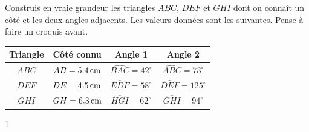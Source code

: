 \documentclass[a4paper,11pt]{report}
\begin{document}
\begin{exo}{Construis en vraie grandeur les triangles $ABC$, $DEF$ et $GHI$ dont on connaît un côté et les deux angles adjacents. Les valeurs données sont les suivantes. Pense à faire un croquis avant.
\begin{center}
\begin{tabular}{|c|c|c|c|}
\hline
\textbf{Triangle} & \textbf{Côté connu} & \textbf{Angle 1} & \textbf{Angle 2} \\
\hline
$ABC$ & $AB = \tunit{5,4}{cm}$ & $\widehat{BAC} = 42^\circ$ & $\widehat{ABC} = 73^\circ$ \\
\hline
$DEF$ & $DE = \tunit{4,5}{cm}$ & $\widehat{EDF} = 58^\circ$ & $\widehat{DEF} = 125^\circ$ \\
\hline
$GHI$ & $GH = \tunit{6,3}{cm}$ & $\widehat{HGI} = 62^\circ$ & $\widehat{GHI} = 94^\circ$ \\
\hline
\end{tabular}
\end{center}
}{1}
\end{exo}
\end{document}
